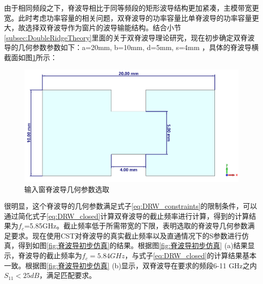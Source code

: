 \documentclass[master]{thesis-uestc}
\begin{document}
由于相同频段之下，脊波导相比于同等频段的矩形波导结构更加紧凑，主模带宽更宽。此时考虑功率容量的相关问题，双脊波导的功率容量比单脊波导的功率容量更大，故选择双脊波导作为窗片的波导输能结构。结合小节\ref{subsec:DoubleRidgeTheory}里面的关于双脊波导理论研究，现在初步确定双脊波导的几何参数参数如下：a=20mm, b=10mm, d=5mm, s=4mm ，具体的脊波导横截面如图\ref{fig:6-11GHzDRW}所示：
\begin{figure}[!htb]
    \includegraphics[width=0.7\linewidth]{pic/chapter3/6-11GHzDRW.png}
    \caption{输入窗脊波导几何参数选取}
    \label{fig:6-11GHzDRW}
\end{figure}

很明显，这个脊波导的几何参数满足式子\ref{eq:DRW_constraints}的限制条件，可以通过简化式子\ref{eq:DRW_closed}计算双脊波导的截止频率进行计算，得到的计算结果为$f_c$=5.85GHz。截止频率低于所需带宽的下限，表明选取的脊波导几何参数满足要求。现在使用CST对脊波导的真实截止频率以及直通情况下的S参数进行仿真，得到如图\ref{fig:脊波导初步仿真}的结果。根据图\ref{fig:脊波导初步仿真} (a)结果显示，脊波导的截止频率为$f_c=5.84GHz$，与式子\ref{eq:DRW_closed}的计算结果基本一致。根据图\ref{fig:脊波导初步仿真} (b)显示，双脊波导在要求的频段6-11 GHz之内$S_{11}<25 dB$，满足匹配要求。
\end{document}
